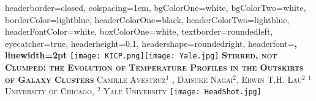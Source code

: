 \documentclass[landscape,a0paper,fontscale=0.285]{baposter} %
\begin{document}
\begin{poster}
{
headerborder=closed, %
colspacing=1em, %
bgColorOne=white, %
bgColorTwo=white, %
borderColor=lightblue, %
headerColorOne=black, %
headerColorTwo=lightblue, %
headerFontColor=white, %
boxColorOne=white, %
textborder=roundedleft, %
eyecatcher=true, %
headerheight=0.1\textheight, %
headershape=roundedright, %
headerfont=\Large\bf\textsc, %
linewidth=2pt %
}
%
{\texttt{[image: KICP.png]}\texttt{[image: Yale.jpg]}} %
{\bf\textsc{Stirred, not Clumped: the Evolution of Temperature Profiles in the Outskirts of Galaxy Clusters}\vspace{0.5em}} %
{\textsc{ {\Large Camille Avestruz$^{1}$ , Daisuke Nagai$^2$, Erwin T.H. Lau$^2$}  \hspace{10pt} {\large $^1$University of Chicago, $^2$ Yale University}}} %
{\texttt{[image: HeadShot.jpg]}} %



\end{poster}
\end{document}
